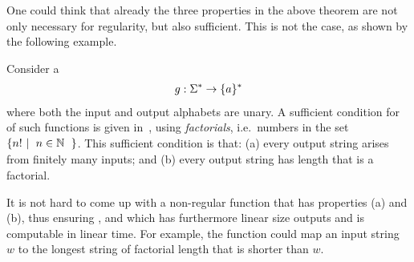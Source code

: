 One could think that already the three properties in the above theorem are not
only necessary for regularity, but also sufficient. This is not the case, as
shown by the following example.

\begin{myexample}[Factorials]
    \label{ex:not-regular-but-continuous-over-finite-fields}
    Consider a 
    \begin{align*}
    g : \Sigma^* \to \{a\}^*
    \end{align*}
    where both the input and output alphabets are unary. A sufficient condition 
    for  of such functions is given in~\cite[Example 2.12]{bojanczykTitoRegular23},
    using \emph{factorials}, i.e.~numbers in the set $\setbuild{n!}{$n \in \Nat$}$. 
    This sufficient condition is that: 
    (a) every output string arises from finitely many inputs; and
    (b) every output string has length that is a factorial. 

    It is not hard to come up with a non-regular function that has properties
    (a) and (b), thus ensuring , and which has furthermore
    linear size outputs and is computable in linear time. For example, the
    function could map an input string $w$ to the longest string of factorial
    length that is shorter than $w$. 
\end{myexample}
